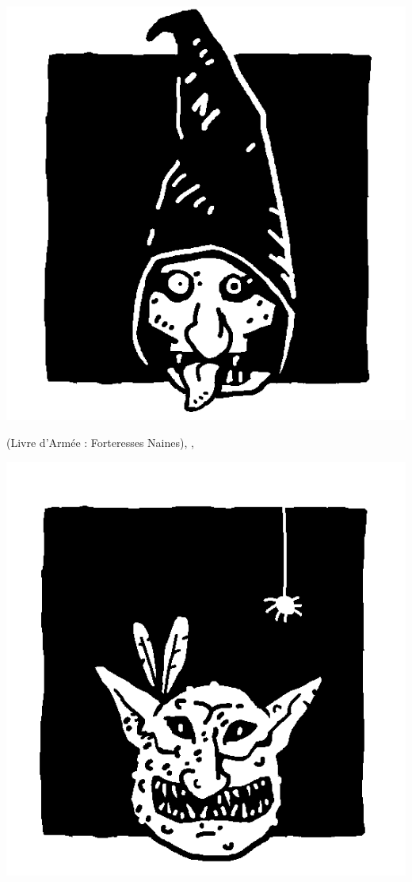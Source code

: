 \begin{multicols}{3}
\begin{center}
\includegraphics[width=\logosize]{pics/cavegoblin.png}
\vspace*{-1cm}\subsubtitle{\cavegoblin}

\vspace*{5pt}\hatred{} (Livre d'Armée : Forteresses Naines), \unruly{}, \insignificant{}
\end{center}

\columnbreak

\begin{center}
\includegraphics[width=\logosize]{pics/forestgoblin.png}
\vspace*{-1cm}\subsubtitle{\forestgoblin}


\end{center}
\end{multicols}
